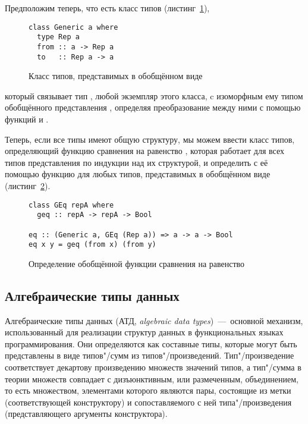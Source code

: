 Предположим теперь, что есть класс типов (листинг~\ref{list:generic}),
\begin{figure}[h]
\begin{framed}
\vspace{-0.25cm}
\begin{lstlisting}
class Generic a where
  type Rep a
  from :: a -> Rep a
  to   :: Rep a -> a
\end{lstlisting}
\vspace{-0.25cm}
\end{framed}
\caption{Класс типов, представимых в обобщённом виде}
\label{list:generic}
\end{figure}
который связывает тип , любой экземпляр этого класса, c
изоморфным ему типом обобщённого представления ,
определяя преобразование между ними с помощью функций
 и .

Теперь, если все типы  имеют общую структуру, мы
можем ввести класс типов, определяющий функцию сравнения на
равенство , которая работает для всех типов
представления по индукции над их структурой, и определить с её
помощью функцию  для любых типов, представимых в
обобщённом виде (листинг~\ref{list:geq}).

\begin{figure}[h]
\begin{framed}
\vspace{-0.25cm}
\begin{lstlisting}
class GEq repA where
  geq :: repA -> repA -> Bool

eq :: (Generic a, GEq (Rep a)) => a -> a -> Bool
eq x y = geq (from x) (from y)
\end{lstlisting}
\vspace{-0.25cm}
\end{framed}
\caption{Определение обобщённой функции сравнения на равенство}
\label{list:geq}
\end{figure}

\subsection{Алгебраические типы данных}

Алгебраические типы данных
(АТД, \textsl{algebraic data types})~---~основной механизм,
использованный для реализации структур данных в функциональных
языках программирования. Они определяются как составные типы,
которые могут быть представлены в виде типов"/сумм из
типов"/произведений. Тип"/произведение соответствует декартову
произведению множеств значений типов, а тип"/сумма в теории
множеств совпадает с дизъюнктивным, или размеченным,
объединением, то есть множеством, элементами которого являются
пары, состоящие из метки (соответствующей конструктору) и
сопоставляемого с ней типа"/произведения (представляющего
аргументы конструктора).


